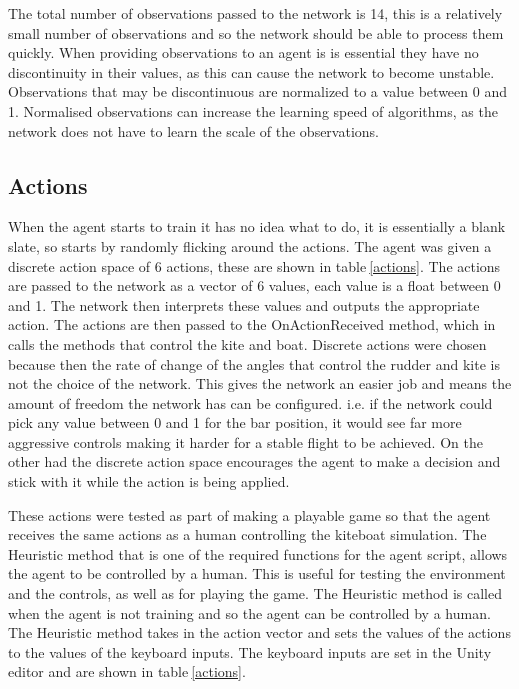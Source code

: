 The total number of observations passed to the network is 14, this is a relatively small number of observations and so the network should be able to process them quickly. When providing observations to an agent is is essential they have no discontinuity in their values, as this can cause the network to become unstable. Observations that may be discontinuous are normalized to a value between 0 and 1. Normalised observations can increase the learning speed of algorithms, as the network does not have to learn the scale of the observations.

\subsection{Actions}
When the agent starts to train it has no idea what to do, it is essentially a blank slate, so starts by randomly flicking around the actions. The agent was given a discrete action space of 6 actions, these are shown in table$~$\ref{actions}. The actions are passed to the network as a vector of 6 values, each value is a float between 0 and 1. The network then interprets these values and outputs the appropriate action. The actions are then passed to the OnActionReceived method, which in calls the methods that control the kite and boat. Discrete actions were chosen because then the rate of change of the angles that control the rudder and kite is not the choice of the network. This gives the network an easier job and means the amount of freedom the network has can be configured. i.e. if the network could pick any value between 0 and 1 for the bar position, it would see far more aggressive controls making it harder for a stable flight to be achieved. On the other had the discrete action space encourages the agent to make a decision and stick with it while the action is being applied. 

These actions were tested as part of making a playable game so that the agent receives the same actions as a human controlling the kiteboat simulation. The Heuristic method that is one of the required functions for the agent script, allows the agent to be controlled by a human. This is useful for testing the environment and the controls, as well as for playing the game. The Heuristic method is called when the agent is not training and so the agent can be controlled by a human. The Heuristic method takes in the action vector and sets the values of the actions to the values of the keyboard inputs. The keyboard inputs are set in the Unity editor and are shown in table$~$\ref{actions}. 

